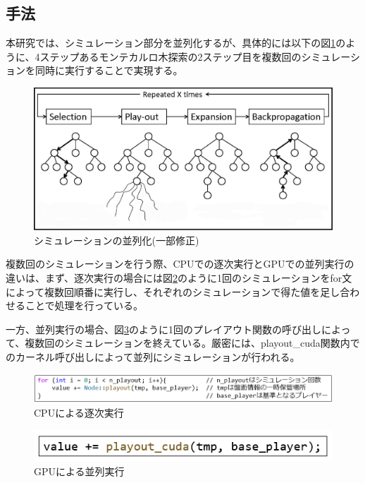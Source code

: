 \documentclass[10pt, a4paper]{jsarticle}
\begin{document}
\subsection{手法}
本研究では、シミュレーション部分を並列化するが、具体的には以下の図\ref{fig:parallel}のように、4ステップあるモンテカルロ木探索の2ステップ目を複数回のシミュレーションを同時に実行することで実現する。
\begin{figure}[ht]
    \begin{center}
        \includegraphics[width=15cm]{img/mcts_parallel.jpg}
        \caption{シミュレーションの並列化\cite{img:parallel}(一部修正)} \label{fig:parallel}
    \end{center}
\end{figure}
\par 複数回のシミュレーションを行う際、CPUでの逐次実行とGPUでの並列実行の違いは、まず、逐次実行の場合には図\ref{fig:cpu_mcts_code}のように1回のシミュレーションをfor文によって複数回順番に実行し、それぞれのシミュレーションで得た値を足し合わせることで処理を行っている。
\par 一方、並列実行の場合、図\ref{fig:gpu_mcts_code}のように1回のプレイアウト関数の呼び出しによって、複数回のシミュレーションを終えている。厳密には、playout\_cuda関数内でのカーネル呼び出しによって並列にシミュレーションが行われる。
\begin{figure}[ht]
    \begin{center}
        \includegraphics[width=15cm]{img/cpu_mcts_code.png}
        \caption{CPUによる逐次実行}
        \label{fig:cpu_mcts_code}
    \end{center}
\end{figure}
\begin{figure}[ht]
    \begin{center}
        \includegraphics[width=12cm]{img/gpu_mcts_code.png}
        \caption{GPUによる並列実行}
        \label{fig:gpu_mcts_code}
    \end{center}
\end{figure}
\end{document}
